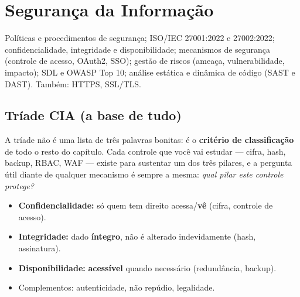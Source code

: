 \chapter{Segurança da Informação}
\label{cap:seguranca}

\begin{edital}
Políticas e procedimentos de segurança; ISO/IEC 27001:2022 e 27002:2022;
confidencialidade, integridade e disponibilidade; mecanismos de segurança
(controle de acesso, OAuth2, SSO); gestão de riscos (ameaça, vulnerabilidade,
impacto); SDL e OWASP Top 10; análise estática e dinâmica de código (SAST e
DAST). Também: HTTPS, SSL/TLS.
\end{edital}

\section{Tríade CIA (a base de tudo)}

A tríade não é uma lista de três palavras bonitas: é o \textbf{critério de
classificação} de todo o resto do capítulo. Cada controle que você vai
estudar --- cifra, hash, backup, RBAC, WAF --- existe para sustentar um dos
três pilares, e a pergunta útil diante de qualquer mecanismo é sempre a mesma:
\emph{qual pilar este controle protege?}

\begin{itemize}
\item \textbf{Confidencialidade:} só quem tem direito acessa/\textbf{vê}
(cifra, controle de acesso).
\item \textbf{Integridade:} dado \textbf{íntegro}, não é alterado
indevidamente (hash, assinatura).
\item \textbf{Disponibilidade:} \textbf{acessível} quando necessário
(redundância, backup).
\item Complementos: autenticidade, não repúdio, legalidade.
\end{itemize}

